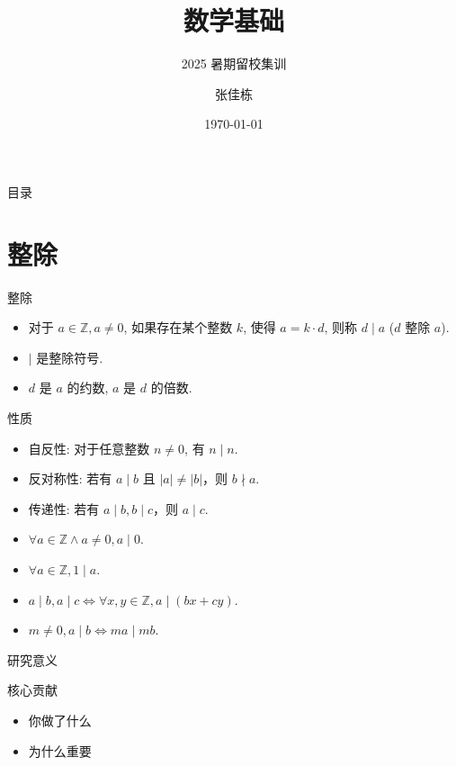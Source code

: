 \documentclass[aspectratio=169]{beamer}  %
\title{数学基础}
\subtitle{2025 暑期留校集训}
\author{张佳栋}
\institute{东北大学\\计算机科学与工程学院}
\date{\today}
\begin{document}
\begin{frame}
  \titlepage
\end{frame}

\begin{frame}{目录}
  \tableofcontents
\end{frame}


\section{整除}
\begin{frame}{整除}
  \begin{itemize}
    \item 对于 $a \in \mathbb{Z}, a \neq 0$, 如果存在某个整数 $k$, 使得 $a = k \cdot d$, 则称 $d \mid a$ ($d$ 整除 $a$).
    \item $\mid$ 是整除符号.
    \item $d$ 是 $a$ 的约数, $a$ 是 $d$ 的倍数.
  \end{itemize}
\end{frame}

\begin{frame}{性质}
  \begin{itemize}
    \item 自反性: 对于任意整数 $n \neq 0$, 有 $n \mid n$.
    \item 反对称性: 若有 $a \mid b$ 且 $|a| \neq |b|$，则 $b \nmid a$.
    \item 传递性: 若有 $a \mid b, b \mid c$，则 $a \mid c$.
    \item $\forall a \in \mathbb{Z} \land a \neq 0, a \mid 0$.
    \item $\forall a \in \mathbb{Z}, 1 \mid a$.
    \item $a \mid b, a \mid c \Leftrightarrow
          \forall x, y \in \mathbb{Z}, a \mid (bx + cy)$.
    \item $m \neq 0, a \mid b \Leftrightarrow
          ma \mid mb$.
  \end{itemize}
\end{frame}

\begin{frame}
  
\end{frame}

\begin{frame}{研究意义}
  \begin{block}{核心贡献}
    \begin{itemize}
      \item 你做了什么
      \item 为什么重要
    \end{itemize}
  \end{block}
\end{frame}
\end{document}
